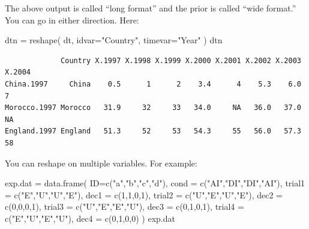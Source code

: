 \documentclass[
  letterpaper,
  DIV=11,
  numbers=noendperiod]{scrreprt}
\newenvironment{Shaded}{\begin{snugshade}}{\end{snugshade}}
\newcommand{\AttributeTok}[1]{\textcolor[rgb]{0.49,0.56,0.16}{#1}}
\newcommand{\DecValTok}[1]{\textcolor[rgb]{0.25,0.63,0.44}{#1}}
\newcommand{\FunctionTok}[1]{\textcolor[rgb]{0.02,0.16,0.49}{#1}}
\newcommand{\NormalTok}[1]{\textcolor[rgb]{0.00,0.44,0.13}{#1}}
\newcommand{\OtherTok}[1]{\textcolor[rgb]{0.00,0.44,0.13}{#1}}
\newcommand{\StringTok}[1]{\textcolor[rgb]{0.25,0.44,0.63}{#1}}
\begin{document}
The above output is called ``long format'' and the prior is called
``wide format.''\\
You can go in either direction. Here:

\begin{Shaded}
\begin{Highlighting}[]
\NormalTok{dtn }\OtherTok{=} \FunctionTok{reshape}\NormalTok{( dt, }\AttributeTok{idvar=}\StringTok{"Country"}\NormalTok{, }\AttributeTok{timevar=}\StringTok{"Year"}\NormalTok{ )}
\NormalTok{dtn}
\end{Highlighting}
\end{Shaded}

\begin{verbatim}
             Country X.1997 X.1998 X.1999 X.2000 X.2001 X.2002 X.2003 X.2004
China.1997     China    0.5      1      2    3.4      4    5.3    6.0      7
Morocco.1997 Morocco   31.9     32     33   34.0     NA   36.0   37.0     NA
England.1997 England   51.3     52     53   54.3     55   56.0   57.3     58
\end{verbatim}

You can reshape on multiple variables. For example:

\begin{Shaded}
\begin{Highlighting}[]
\NormalTok{exp.dat }\OtherTok{=} \FunctionTok{data.frame}\NormalTok{( }\AttributeTok{ID=}\FunctionTok{c}\NormalTok{(}\StringTok{"a"}\NormalTok{,}\StringTok{"b"}\NormalTok{,}\StringTok{"c"}\NormalTok{,}\StringTok{"d"}\NormalTok{), }
      \AttributeTok{cond =} \FunctionTok{c}\NormalTok{(}\StringTok{"AI"}\NormalTok{,}\StringTok{"DI"}\NormalTok{,}\StringTok{"DI"}\NormalTok{,}\StringTok{"AI"}\NormalTok{),}
            \AttributeTok{trial1 =} \FunctionTok{c}\NormalTok{(}\StringTok{"E"}\NormalTok{,}\StringTok{"U"}\NormalTok{,}\StringTok{"U"}\NormalTok{,}\StringTok{"E"}\NormalTok{),}
            \AttributeTok{dec1 =} \FunctionTok{c}\NormalTok{(}\DecValTok{1}\NormalTok{,}\DecValTok{1}\NormalTok{,}\DecValTok{0}\NormalTok{,}\DecValTok{1}\NormalTok{),}
            \AttributeTok{trial2 =} \FunctionTok{c}\NormalTok{(}\StringTok{"U"}\NormalTok{,}\StringTok{"E"}\NormalTok{,}\StringTok{"U"}\NormalTok{,}\StringTok{"E"}\NormalTok{),}
            \AttributeTok{dec2 =} \FunctionTok{c}\NormalTok{(}\DecValTok{0}\NormalTok{,}\DecValTok{0}\NormalTok{,}\DecValTok{0}\NormalTok{,}\DecValTok{1}\NormalTok{),}
                \AttributeTok{trial3 =} \FunctionTok{c}\NormalTok{(}\StringTok{"U"}\NormalTok{,}\StringTok{"E"}\NormalTok{,}\StringTok{"E"}\NormalTok{,}\StringTok{"U"}\NormalTok{),}
            \AttributeTok{dec3 =} \FunctionTok{c}\NormalTok{(}\DecValTok{0}\NormalTok{,}\DecValTok{1}\NormalTok{,}\DecValTok{0}\NormalTok{,}\DecValTok{1}\NormalTok{),}
                \AttributeTok{trial4 =} \FunctionTok{c}\NormalTok{(}\StringTok{"E"}\NormalTok{,}\StringTok{"U"}\NormalTok{,}\StringTok{"E"}\NormalTok{,}\StringTok{"U"}\NormalTok{),}
            \AttributeTok{dec4 =} \FunctionTok{c}\NormalTok{(}\DecValTok{0}\NormalTok{,}\DecValTok{1}\NormalTok{,}\DecValTok{0}\NormalTok{,}\DecValTok{0}\NormalTok{) )}
\NormalTok{exp.dat}
\end{Highlighting}
\end{Shaded}
\end{document}
